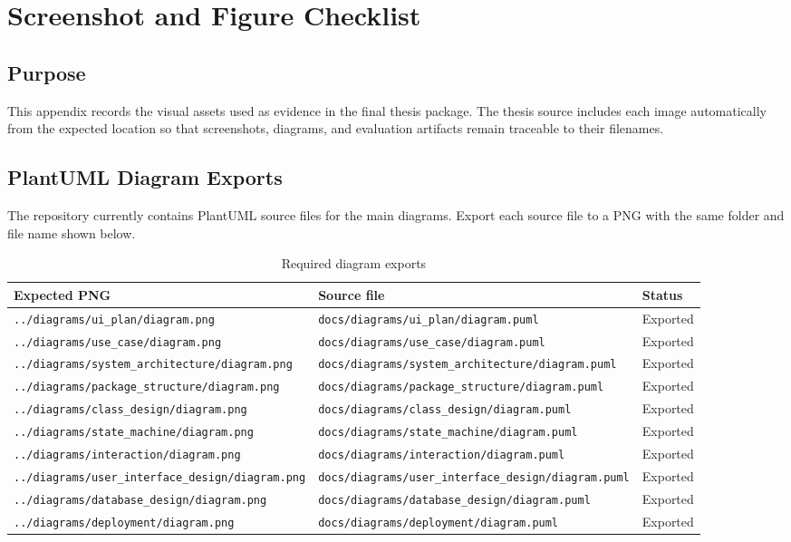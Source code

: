 \chapter{Screenshot and Figure Checklist}

\section{Purpose}

This appendix records the visual assets used as evidence in the final thesis package. The thesis source includes each image automatically from the expected location so that screenshots, diagrams, and evaluation artifacts remain traceable to their filenames.

\section{PlantUML Diagram Exports}

The repository currently contains PlantUML source files for the main diagrams. Export each source file to a PNG with the same folder and file name shown below.

\begin{longtable}{|p{}|p{}|p{}|}
\caption{Required diagram exports}
\label{tab:diagram-checklist}\\
\hline
\textbf{Expected PNG} & \textbf{Source file} & \textbf{Status}\\
\hline
\texttt{../diagrams/ui\_plan/diagram.png} & \texttt{docs/diagrams/ui\_plan/diagram.puml} & Exported\\
\hline
\texttt{../diagrams/use\_case/diagram.png} & \texttt{docs/diagrams/use\_case/diagram.puml} & Exported\\
\hline
\texttt{../diagrams/system\_architecture/diagram.png} & \texttt{docs/diagrams/system\_architecture/diagram.puml} & Exported\\
\hline
\texttt{../diagrams/package\_structure/diagram.png} & \texttt{docs/diagrams/package\_structure/diagram.puml} & Exported\\
\hline
\texttt{../diagrams/class\_design/diagram.png} & \texttt{docs/diagrams/class\_design/diagram.puml} & Exported\\
\hline
\texttt{../diagrams/state\_machine/diagram.png} & \texttt{docs/diagrams/state\_machine/diagram.puml} & Exported\\
\hline
\texttt{../diagrams/interaction/diagram.png} & \texttt{docs/diagrams/interaction/diagram.puml} & Exported\\
\hline
\texttt{../diagrams/user\_interface\_design/diagram.png} & \texttt{docs/diagrams/user\_interface\_design/diagram.puml} & Exported\\
\hline
\texttt{../diagrams/database\_design/diagram.png} & \texttt{docs/diagrams/database\_design/diagram.puml} & Exported\\
\hline
\texttt{../diagrams/deployment/diagram.png} & \texttt{docs/diagrams/deployment/diagram.puml} & Exported\\
\hline
\end{longtable}

